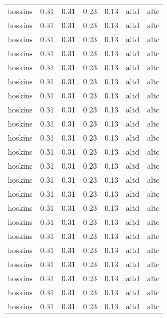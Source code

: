 \begin{tabular}{lrrrrll}
   hoskins &     0.31 &     0.31 &     0.23 &     0.13 &      altd &     altc \\
   hoskins &     0.31 &     0.31 &     0.23 &     0.13 &      altd &     altc \\
   hoskins &     0.31 &     0.31 &     0.23 &     0.13 &      altd &     altc \\
   hoskins &     0.31 &     0.31 &     0.23 &     0.13 &      altd &     altc \\
   hoskins &     0.31 &     0.31 &     0.23 &     0.13 &      altd &     altc \\
   hoskins &     0.31 &     0.31 &     0.23 &     0.13 &      altd &     altc \\
   hoskins &     0.31 &     0.31 &     0.23 &     0.13 &      altd &     altc \\
   hoskins &     0.31 &     0.31 &     0.23 &     0.13 &      altd &     altc \\
   hoskins &     0.31 &     0.31 &     0.23 &     0.13 &      altd &     altc \\
   hoskins &     0.31 &     0.31 &     0.23 &     0.13 &      altd &     altc \\
   hoskins &     0.31 &     0.31 &     0.23 &     0.13 &      altd &     altc \\
   hoskins &     0.31 &     0.31 &     0.23 &     0.13 &      altd &     altc \\
   hoskins &     0.31 &     0.31 &     0.23 &     0.13 &      altd &     altc \\
   hoskins &     0.31 &     0.31 &     0.23 &     0.13 &      altd &     altc \\
   hoskins &     0.31 &     0.31 &     0.23 &     0.13 &      altd &     altc \\
   hoskins &     0.31 &     0.31 &     0.23 &     0.13 &      altd &     altc \\
   hoskins &     0.31 &     0.31 &     0.23 &     0.13 &      altd &     altc \\
   hoskins &     0.31 &     0.31 &     0.23 &     0.13 &      altd &     altc \\
   hoskins &     0.31 &     0.31 &     0.23 &     0.13 &      altd &     altc \\
   hoskins &     0.31 &     0.31 &     0.23 &     0.13 &      altd &     altc \\
   hoskins &     0.31 &     0.31 &     0.23 &     0.13 &      altd &     altc \\
   hoskins &     0.31 &     0.31 &     0.23 &     0.13 &      altd &     altc \\

\end{tabular}
